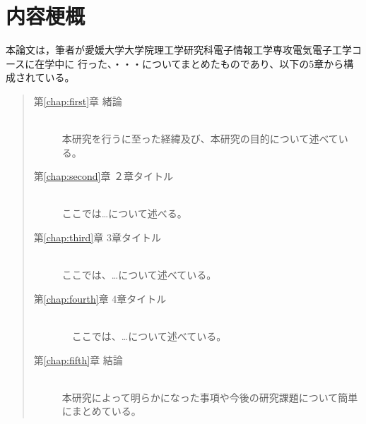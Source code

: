 \chapter*{内容梗概}

本論文は，筆者が愛媛大学大学院理工学研究科電子情報工学専攻電気電子工学コースに在学中に
行った、・・・についてまとめたものであり、以下の5章から構成されている。\\

\begin{quote}
  \begin{description}

    \item[第\ref{chap:first}章 緒論]\ \\
     本研究を行うに至った経緯及び、本研究の目的について述べている。
    \vspace{3.0mm}
    
    \item[第\ref{chap:second}章 ２章タイトル]\ \\ 
	  ここでは…について述べる。
    \vspace{3.0mm}

    \item[第\ref{chap:third}章 3章タイトル]\ \\ 
	  ここでは、…について述べている。
    \vspace{3.0mm}


    \item[第\ref{chap:fourth}章 4章タイトル]\ \\
	　ここでは、…について述べている。
    \vspace{3.0mm}
     
    \item[第\ref{chap:fifth}章 結論]\ \\
      本研究によって明らかになった事項や今後の研究課題について簡単にまとめている。
  \end{description}
\end{quote}
